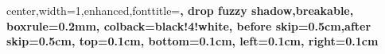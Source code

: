 

    { center,width=1\linewidth,enhanced,fonttitle=\large\bfseries,
      drop fuzzy shadow,breakable,
      boxrule=0.2mm,
      colback=black!4!white,
      before skip=0.5cm,after skip=0.5cm,
      top=0.1cm,
      bottom=0.1cm,
      left=0.1cm,
      right=0.1cm
    }

\newenvironment{columns}[1][1]{}{}
\newenvironment{column}[1]{}{}

\usepackage{titlesec}
\usepackage[dotinlabels]{titletoc}

\makeatletter
\def\fps@figure{h}
\makeatother

\usepackage{caption}
\captionsetup[figure]{labelformat=empty}

\usepackage{rotating}
